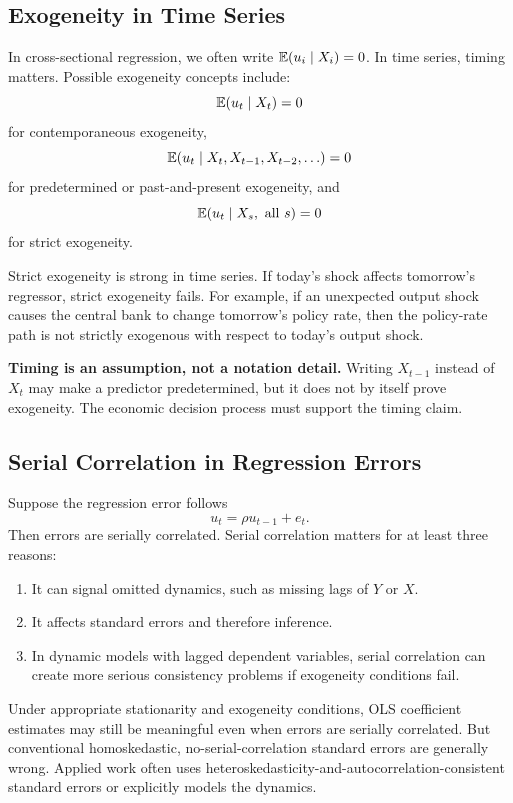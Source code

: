 \subsection{Exogeneity in Time Series}
In cross-sectional regression, we often write $\mathbb{E}(u_i\mid X_i)=0$. In time series, timing matters. Possible exogeneity concepts include:
\[
\mathbb{E}(u_t\mid X_t)=0
\]
for contemporaneous exogeneity,
\[
\mathbb{E}(u_t\mid X_t,X_{t-1},X_{t-2},\ldots)=0
\]
for predetermined or past-and-present exogeneity, and
\[
\mathbb{E}(u_t\mid X_s,\text{ all }s)=0
\]
for strict exogeneity.

Strict exogeneity is strong in time series. If today's shock affects tomorrow's regressor, strict exogeneity fails. For example, if an unexpected output shock causes the central bank to change tomorrow's policy rate, then the policy-rate path is not strictly exogenous with respect to today's output shock.

\begin{boxF}
\textbf{Timing is an assumption, not a notation detail.}
Writing $X_{t-1}$ instead of $X_t$ may make a predictor predetermined, but it does not by itself prove exogeneity. The economic decision process must support the timing claim.
\end{boxF}

\subsection{Serial Correlation in Regression Errors}
Suppose the regression error follows
\[
u_t=\rho u_{t-1}+e_t.
\]
Then errors are serially correlated. Serial correlation matters for at least three reasons:
\begin{enumerate}
\item It can signal omitted dynamics, such as missing lags of $Y$ or $X$.
\item It affects standard errors and therefore inference.
\item In dynamic models with lagged dependent variables, serial correlation can create more serious consistency problems if exogeneity conditions fail.
\end{enumerate}

Under appropriate stationarity and exogeneity conditions, OLS coefficient estimates may still be meaningful even when errors are serially correlated. But conventional homoskedastic, no-serial-correlation standard errors are generally wrong. Applied work often uses heteroskedasticity-and-autocorrelation-consistent standard errors or explicitly models the dynamics.

